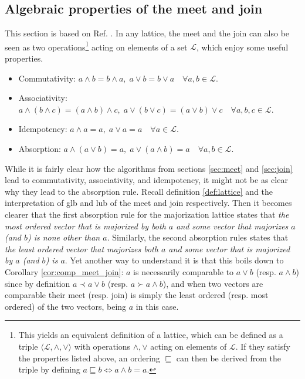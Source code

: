  
\subsection{Algebraic properties of the meet and join}

This section is based on Ref. \cite[pp. 39--41]{davey_introduction_2002}. In any lattice, the meet and the join can also be seen as two operations\footnote{This yields an equivalent definition of a lattice, which can be defined as a triple $\langle \mathcal{L}, \wedge, \vee \rangle$ with operations $\wedge, \vee$ acting on elements of $\mathcal{L}$. If they satisfy the properties listed above, an ordering $\sqsubseteq$ can then be derived from the triple by defining $a \sqsubseteq b \iff a \wedge b = a$.}
acting on elements of a set $\mathcal{L}$, which enjoy some useful properties.

\begin{itemize} \label{it:meet_join_properties}
    \item Commutativity: $a \wedge b = b \wedge a, \; a \vee b = b \vee a \quad \forall a, b \in \mathcal{L}$.
    \item Associativity: $a \wedge (b \wedge c) = (a \wedge b) \wedge c, \;
                            a \vee (b \vee c) = (a \vee b) \vee c \quad \forall a, b, c \in \mathcal{L}$.
    \item Idempotency: $a \wedge a = a, \; a \vee a = a \quad \forall a \in \mathcal{L}$.
    \item Absorption: $a \wedge (a \vee b) = a, \; a \vee (a \wedge b) = a \quad \forall a, b \in \mathcal{L}$.
\end{itemize}

While it is fairly clear how the algorithms from sections \ref{sec:meet} and \ref{sec:join} lead to commutativity, associativity, and idempotency, it might not be as clear why they lead to the absorption rule. Recall definition \ref{def:lattice} and the interpretation of glb and lub of the meet and join respectively. Then it becomes clearer that the first absorption rule for the majorization lattice states that \textit{the most ordered vector that is majorized by both $a$ and some vector that majorizes $a$ (and $b$) is none other than $a$}. Similarly, the second absorption rules states that \textit{the least ordered vector that majorizes both $a$ and some vector that is majorized by $a$ (and $b$) is $a$}. Yet another way to understand it is that this boils down to Corollary \ref{cor:comp_meet_join}: $a$ is necessarily comparable to $a \vee b$ (resp. $a \wedge b$) since by definition $a \prec a \vee b$ (resp. $a \succ a \wedge b$), and when two vectors are comparable their meet (resp. join) is simply the least ordered (resp. most ordered) of the two vectors, being $a$ in this case.

